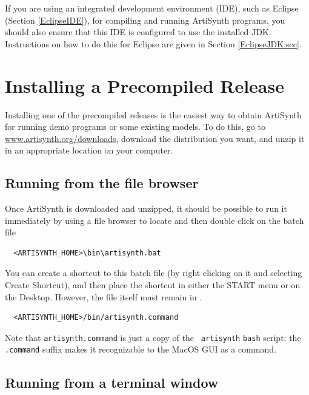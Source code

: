 \begin{sideblock}
If you are using an integrated development environment (IDE), such as
Eclipse (Section \ref{EclipseIDE}), for compiling and running
ArtiSynth programs, you should also ensure that this IDE is configured
to use the installed JDK. Instructions on how to do this for Eclipse
are given in Section \ref{EclipseJDK:sec}.
\end{sideblock}

\section{Installing a Precompiled Release}
\label{PrecompiledRelease}

Installing one of the precompiled releases is the easiest way to
obtain ArtiSynth for running demo programs or some existing models.
To do this, go to \href{http://www.artisynth.org/downloads}%
{www.artisynth.org/downloads}, download the distribution you want, and
unzip it in an appropriate location on your computer.

\ifLinux
\else %
\subsection{Running from the file browser}
\label{runningFileBrowser}

Once ArtiSynth is downloaded and unzipped, it should be possible to
run it immediately by using a file browser to locate and then
double click on the batch file
\ifWindows
\begin{verbatim}
  <ARTISYNTH_HOME>\bin\artisynth.bat
\end{verbatim}

You can create a shortcut to this batch file (by right clicking on it
and selecting {\sf Create Shortcut}), and then place the shortcut in
either the {\sf START} menu or on the Desktop. However, the file
itself must remain in .
\fi
\ifMacOS
\begin{verbatim}
  <ARTISYNTH_HOME>/bin/artisynth.command
\end{verbatim}
Note that {\tt artisynth.command} is just a copy of the {\tt
artisynth} {\tt bash} script; the {\tt .command} suffix makes it
recognizable to the MacOS GUI as a command.
\fi
\fi %

\subsection{Running from a terminal window}
\label{artisynthCommandLine}

